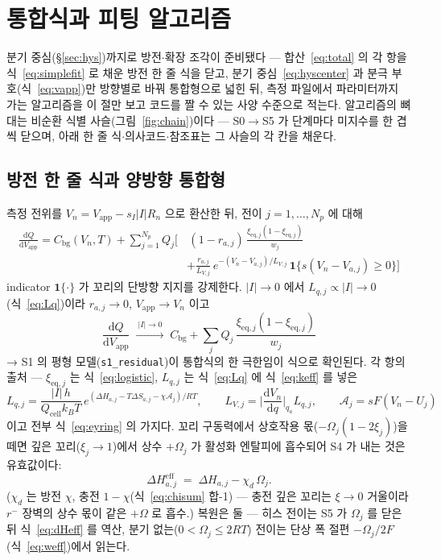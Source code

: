 \documentclass[11pt,a4paper]{article}
\newcommand{\dd}{\mathrm{d}}
\newcommand{\eff}{\mathrm{eff}}
\newcommand{\eq}{\mathrm{eq}}
\newcommand{\app}{\mathrm{app}}
\newcommand{\cell}{\mathrm{cell}}
\newcommand{\bg}{\mathrm{bg}}
\begin{document}
\section{통합식과 피팅 알고리즘}\label{sec:master}
분기 중심(\S\ref{sec:hys})까지로 방전$\cdot$확장 조각이 준비됐다 — 합산~\eqref{eq:total} 의 각 항을 식~\eqref{eq:simplefit} 로 채운 방전 한 줄 식을 닫고, 분기 중심~\eqref{eq:hyscenter} 과 분극 부호(식~\eqref{eq:vapp})만 방향별로 바꿔 통합형으로 넓힌 뒤, 측정 파일에서 파라미터까지 가는 알고리즘을 이 절만 보고 코드를 짤 수 있는 사양 수준으로 적는다. 알고리즘의 뼈대는 비순환 식별 사슬(그림~\ref{fig:chain})이다 — S0$\to$S5 가 단계마다 미지수를 한 겹씩 닫으며, 아래 한 줄 식$\cdot$의사코드$\cdot$참조표는 그 사슬의 각 칸을 채운다.

\subsection{방전 한 줄 식과 양방향 통합형}
측정 전위를 $V_n=V_\app-s_I|I|R_n$ 으로 환산한 뒤, 전이 $j=1,\dots,N_p$ 에 대해
\begin{equation}
\boxed{\;\begin{aligned}\frac{\dd Q}{\dd V_\app}=C_\bg(V_n,T)+\sum_{j=1}^{N_p}Q_j\bigg[&\,
(1-r_{a,j})\,\frac{\xi_{\eq,j}(1-\xi_{\eq,j})}{w_j}\\[-2pt]
&+\frac{r_{a,j}}{L_{V,j}}\,e^{-(V_n-V_{a,j})/L_{V,j}}\,\mathbf 1\{s(V_n-V_{a,j})\ge0\}\bigg]\end{aligned}\;}
\label{eq:master}
\end{equation}
indicator $\mathbf 1\{\cdot\}$ 가 꼬리의 단방향 지지를 강제한다. $|I|\to0$ 에서 $L_{q,j}\propto|I|\to0$(식~\eqref{eq:Lq})이라 $r_{a,j}\to0$, $V_\app\to V_n$ 이고
\begin{equation*}
\frac{\dd Q}{\dd V_\app}\;\xrightarrow{\ |I|\to0\ }\;
C_\bg+\sum_jQ_j\,\frac{\xi_{\eq,j}(1-\xi_{\eq,j})}{w_j}
\end{equation*}
→ S1 의 평형 모델(\texttt{s1\_residual})이 통합식의 한 극한임이 식으로 확인된다. 각 항의 출처 — $\xi_{\eq,j}$ 는 식~\eqref{eq:logistic}, $L_{q,j}$ 는 식~\eqref{eq:Lq} 에 식~\eqref{eq:keff} 를 넣은
\begin{equation*}
L_{q,j}=\frac{|I|\,h}{Q_\cell k_BT}\,
e^{(\Delta H_{a,j}-T\Delta S_{a,j}-\chi\mathcal A_j)/RT},
\qquad L_{V,j}=\Big|\frac{\dd V_n}{\dd q}\Big|_{q_a}L_{q,j},
\qquad \mathcal A_j=sF(V_n-U_j)
\end{equation*}
이고 전부 식~\eqref{eq:eyring} 의 가지다. 꼬리 구동력에서 상호작용 몫($-\Omega_j(1-2\xi_j)$)을 떼면 깊은 꼬리($\xi_j\to1$)에서 상수 $+\Omega_j$ 가 활성화 엔탈피에 흡수되어 S4 가 내는 것은 유효값이다:
\begin{equation}
\Delta H_{a,j}^{\eff}\;=\;\Delta H_{a,j}-\chi_d\,\Omega_j.
\label{eq:dHeff}
\end{equation}
($\chi_d$ 는 방전 $\chi$, 충전 $1-\chi$(식~\eqref{eq:chisum} 합-1) — 충전 깊은 꼬리는 $\xi\to0$ 거울이라 $r^-$ 장벽의 상수 몫이 같은 $+\Omega$ 로 흡수.) 복원은 둘 — 히스 전이는 S5 가 $\Omega_j$ 를 닫은 뒤 식~\eqref{eq:dHeff} 를 역산, 분기 없는($0<\Omega_j\le2RT$) 전이는 단상 폭 절편 $-\Omega_j/2F$(식~\eqref{eq:weff})에서 읽는다.
\end{document}
